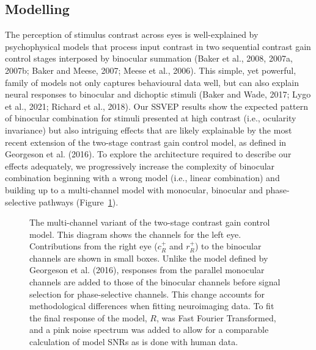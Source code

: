 \documentclass[
  12pt,
]{article}
\begin{document}
\subsection{Modelling}\label{modelling}

The perception of stimulus contrast across eyes is well-explained by
psychophysical models that process input contrast in two sequential
contrast gain control stages interposed by binocular summation (Baker et
al., 2008, 2007a, 2007b; Baker and Meese, 2007; Meese et al., 2006).
This simple, yet powerful, family of models not only captures
behavioural data well, but can also explain neural responses to
binocular and dichoptic stimuli (Baker and Wade, 2017; Lygo et al.,
2021; Richard et al., 2018). Our SSVEP results show the expected pattern
of binocular combination for stimuli presented at high contrast (i.e.,
ocularity invariance) but also intriguing effects that are likely
explainable by the most recent extension of the two-stage contrast gain
control model, as defined in Georgeson et al. (2016). To explore the
architecture required to describe our effects adequately, we
progressively increase the complexity of binocular combination beginning
with a wrong model (i.e., linear combination) and building up to a
multi-channel model with monocular, binocular and phase-selective
pathways (Figure~\ref{fig-modelDiagram}).

\begin{figure}


\caption{\label{fig-modelDiagram}The multi-channel variant of the
two-stage contrast gain control model. This diagram shows the channels
for the left eye. Contributions from the right eye (\(c^+_R\) and
\(r^+_R\)) to the binocular channels are shown in small boxes. Unlike
the model defined by Georgeson et al. (2016), responses from the
parallel monocular channels are added to those of the binocular channels
before signal selection for phase-selective channels. This change
accounts for methodological differences when fitting neuroimaging data.
To fit the final response of the model, \(R\), was Fast Fourier
Transformed, and a pink noise spectrum was added to allow for a
comparable calculation of model SNRs as is done with human data.}

\end{figure}%
\end{document}
